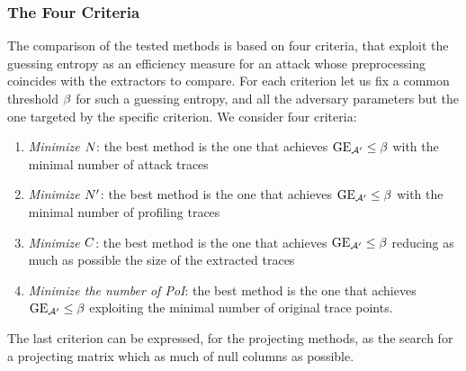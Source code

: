 \subsubsection{The Four Criteria}
The comparison of the tested methods is based on four criteria, that exploit the guessing entropy as an efficiency measure for an attack whose preprocessing coincides with the extractors to compare. For each criterion let us fix a common threshold $\threshold$ for such a guessing entropy, and all the adversary parameters but the one targeted by the specific criterion. We consider four criteria: 
\begin{enumerate}
\item {\em Minimize $\numTraces[]$}: the best method is the one that achieves $\guessingEntropy_{\adversary'}\leq \threshold$ with the minimal number of attack traces
\item {\em Minimize $\numTraces[]'$}: the best method is the one that achieves $\guessingEntropy_{\adversary'}\leq \threshold$ with the minimal number of profiling traces
\item {\em Minimize $\newTraceLength$}: the best method is the one that achieves $\guessingEntropy_{\adversary'}\leq \threshold$ reducing as much as possible the size of the extracted traces
\item {\em Minimize the number of PoI}: the best method is the one that achieves $\guessingEntropy_{\adversary'}\leq \threshold$ exploiting the minimal number of original trace points.
\end{enumerate}
The last criterion can be expressed, for the projecting methods, as the search for a projecting matrix which as much of null columns as possible. 













